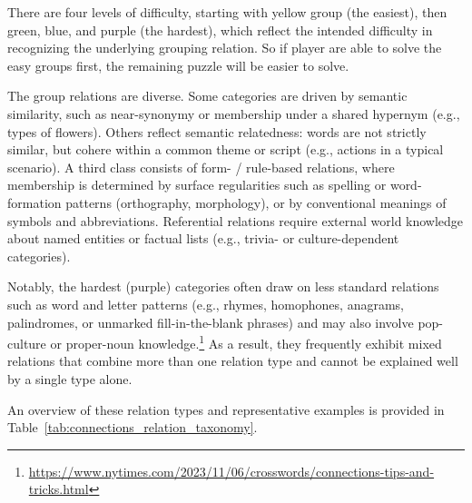 There are four levels of difficulty, starting with yellow group (the easiest), then green, blue, and purple (the hardest), which reflect the intended difficulty in recognizing the underlying grouping relation. So if player are able to solve the easy groups first, the remaining puzzle will be easier to solve.

The group relations are diverse. Some categories are driven by semantic similarity, such as near-synonymy or membership under a shared hypernym (e.g., types of flowers). Others reflect semantic relatedness: words are not strictly similar, but cohere within a common theme or script (e.g., actions in a typical scenario). A third class consists of form- / rule-based relations, where membership is determined by surface regularities such as spelling or word-formation patterns (orthography, morphology), or by conventional meanings of symbols and abbreviations. Referential relations require external world knowledge about named entities or factual lists (e.g., trivia- or culture-dependent categories).
	
Notably, the hardest (purple) categories often draw on less standard relations such as word and letter patterns (e.g., rhymes, homophones, anagrams, palindromes, or unmarked fill-in-the-blank phrases) and may also involve pop-culture or proper-noun knowledge.\footnote{\url{https://www.nytimes.com/2023/11/06/crosswords/connections-tips-and-tricks.html}} As a result, they frequently exhibit mixed relations that combine more than one relation type and cannot be explained well by a single type alone.

An overview of these relation types and representative examples is provided in Table~\ref{tab:connections_relation_taxonomy}.

